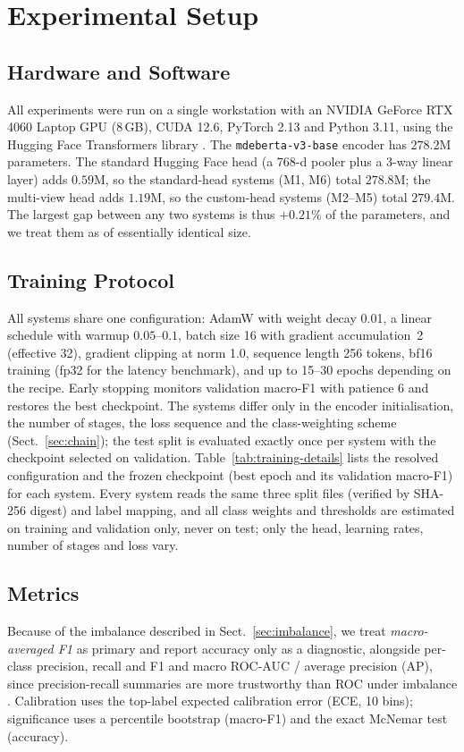\section{Experimental Setup}
\label{sec:setup}

\subsection{Hardware and Software}
All experiments were run on a single workstation with an NVIDIA GeForce RTX
4060 Laptop GPU (8\,GB), CUDA 12.6, PyTorch 2.13 and Python 3.11, using the
Hugging Face Transformers library \cite{wolf2020transformers}.  The
\texttt{mdeberta-v3-base} encoder has $278.2$M parameters.  The standard Hugging
Face head (a 768-d pooler plus a 3-way linear layer) adds $0.59$M, so the
standard-head systems (M1, M6) total $278.8$M; the multi-view head adds
$1.19$M, so the custom-head systems (M2--M5) total $279.4$M.  The largest gap
between any two systems is thus $+0.21\%$ of the parameters, and we treat them as
of essentially identical size.

\subsection{Training Protocol}
All systems share one configuration: AdamW \cite{loshchilov2019adamw} with weight
decay 0.01, a linear schedule with warmup $0.05$--$0.1$, batch size 16 with
gradient accumulation~2 (effective 32), gradient clipping at norm 1.0, sequence
length 256 tokens, bf16 training (fp32 for the latency benchmark), and up to
15--30 epochs depending on the recipe.  Early stopping monitors validation
macro-F1 with patience 6 and restores the best checkpoint.  The systems differ
only in the encoder initialisation, the number of stages, the loss sequence and
the class-weighting scheme (Sect.~\ref{sec:chain}); the test split is evaluated
exactly once per system with the checkpoint selected on validation.
Table~\ref{tab:training-details} lists the resolved configuration and the frozen
checkpoint (best epoch and its validation macro-F1) for each system.  Every system
reads the same three split files (verified by SHA-256 digest) and label mapping,
and all class weights and thresholds are estimated on training and validation only,
never on test; only the head, learning rates, number of stages and loss vary.



\subsection{Metrics}
Because of the imbalance described in Sect.~\ref{sec:imbalance}, we treat
\emph{macro-averaged F1} as primary and report accuracy only as a diagnostic,
alongside per-class precision, recall and F1 and macro ROC-AUC / average precision
(AP), since precision-recall summaries are more trustworthy than ROC under
imbalance \cite{saito2015precision}.  Calibration uses the top-label expected
calibration error (ECE, 10 bins); significance uses a percentile bootstrap
(macro-F1) and the exact McNemar test (accuracy).
